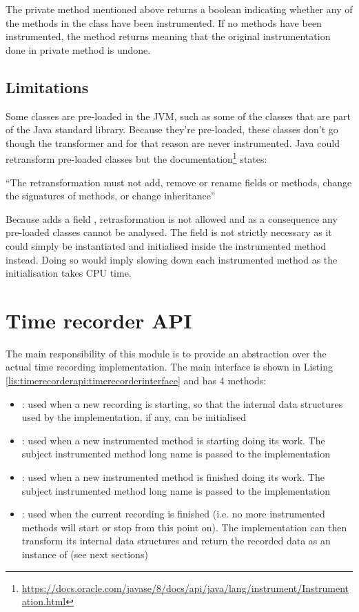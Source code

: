 \noindent The private method  mentioned above returns a boolean indicating whether any of the methods in the class have been instrumented. If no methods have been instrumented, the  method returns  meaning that the original instrumentation done in private method  is undone.

\subsection{Limitations}
\label{sec:implementation:agent:limitations}
Some classes are pre-loaded in the JVM, such as some of the classes that are part of the Java standard library. Because they're pre-loaded, these classes don't go though the transformer and for that reason are never instrumented. Java could retransform pre-loaded classes but the documentation\footnote{\url{https://docs.oracle.com/javase/8/docs/api/java/lang/instrument/Instrumentation.html}} states:

\enquote{The retransformation must not add, remove or rename fields or methods, change the signatures of methods, or change inheritance}

\noindent Because  adds a field , retrasformation is not allowed and as a consequence any pre-loaded classes cannot be analysed. The field is not strictly necessary as it could simply be instantiated and initialised inside the instrumented method instead. Doing so would imply slowing down each instrumented method as the initialisation takes CPU time.

\section{Time recorder API}
\label{sec:implementation:timerecorderapi}
The main responsibility of this module is to provide an abstraction over the actual time recording implementation. The main interface is shown in Listing \ref{lis:timerecorderapi:timerecorderinterface} and has 4 methods:
\begin{itemize}
  \item \textbf{}: used when a new recording is starting, so that the internal data structures used by the implementation, if any, can be initialised
  \item \textbf{}: used when a new instrumented method is starting doing its work. The subject instrumented method long name is passed to the implementation
  \item \textbf{}: used when a new instrumented method is finished doing its work. The subject instrumented method long name is passed to the implementation
  \item \textbf{}: used when the current recording is finished (i.e. no more instrumented methods will start or stop from this point on). The implementation can then transform its internal data structures and return the recorded data as an instance of  (see next sections)
\end{itemize}

